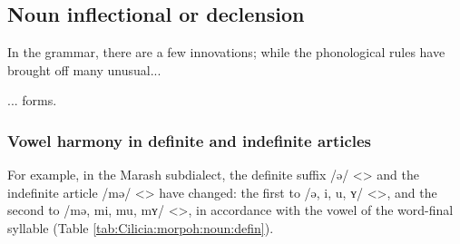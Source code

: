 \subsection{Noun inflectional or declension}
In the grammar, there are a few innovations; while the phonological rules have brought off many unusual...



\begin{adjarianpage}\label{page:202}\end{adjarianpage}%

... forms. 

\subsubsection{Vowel harmony in definite and indefinite articles}

For example, in the Marash subdialect, the definite suffix /ə/ <> and the indefinite article /mə/ <> have changed: the first to /ə, i, u, ʏ/ <>, and the second to /mə, mi, mu, mʏ/ <>, in accordance with the vowel of the word-final syllable (Table \ref{tab:Cilicia:morpoh:noun:defin}).




